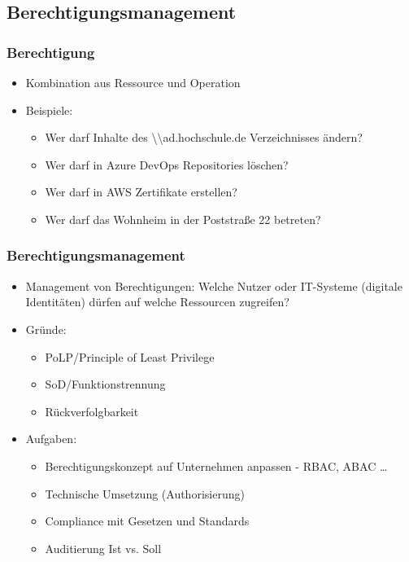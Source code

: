 \documentclass[11pt]{beamer}
\begin{document}
\subsection{Berechtigungsmanagement}
\begin{frame}
  \frametitle{Berechtigung}
  \begin{itemize}
    \item Kombination aus Ressource und Operation~
    \item Beispiele:
          \begin{itemize}
            \item Wer darf Inhalte des \textbackslash{}\textbackslash{}ad.hochschule.de Verzeichnisses ändern?
            \item Wer darf in Azure DevOps Repositories löschen?
            \item Wer darf in AWS Zertifikate erstellen?
            \item Wer darf das Wohnheim in der Poststraße 22 betreten?
          \end{itemize}
  \end{itemize}
\end{frame}

\begin{frame}
  \frametitle{Berechtigungsmanagement}
  \begin{itemize}
    \item Management von Berechtigungen: Welche Nutzer oder IT-Systeme (digitale Identitäten) dürfen auf welche Ressourcen zugreifen?
    \item Gründe:
          \begin{itemize}
            \item PoLP/Principle of Least Privilege~
            \item SoD/Funktionstrennung
            \item Rückverfolgbarkeit
          \end{itemize}
    \item Aufgaben:
          \begin{itemize}
            \item Berechtigungskonzept auf Unternehmen anpassen - RBAC, ABAC \ldots
            \item Technische Umsetzung (Authorisierung)
            \item Compliance mit Gesetzen und Standards
            \item Auditierung Ist vs. Soll~
          \end{itemize}
  \end{itemize}
\end{frame}
\end{document}
